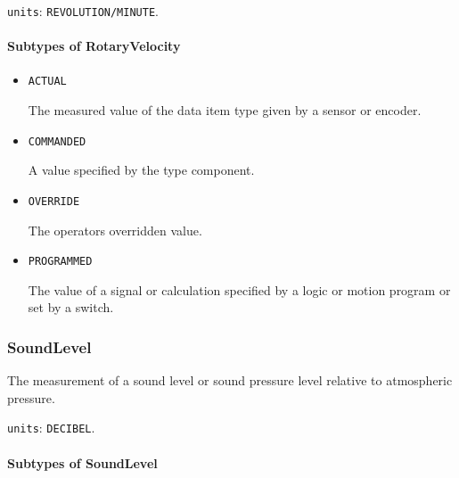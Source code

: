 \texttt{units}: \texttt{REVOLUTION/MINUTE}.

\paragraph{Subtypes of RotaryVelocity}\mbox{}
\label{sec:Subtypes of RotaryVelocity}

\begin{itemize}

\item \texttt{ACTUAL}


The measured value of the data item type given by a sensor or encoder.

\item \texttt{COMMANDED}


A value specified by the  type component.

\item \texttt{OVERRIDE}


The operators overridden value.

\item \texttt{PROGRAMMED}


The value of a signal or calculation specified by a logic or motion program or set by a switch.


\end{itemize}







\subsubsection{SoundLevel}
\label{sec:SoundLevel}



The measurement of a sound level or sound pressure level relative to atmospheric pressure.


\texttt{units}: \texttt{DECIBEL}.

\paragraph{Subtypes of SoundLevel}\mbox{}
\label{sec:Subtypes of SoundLevel}

